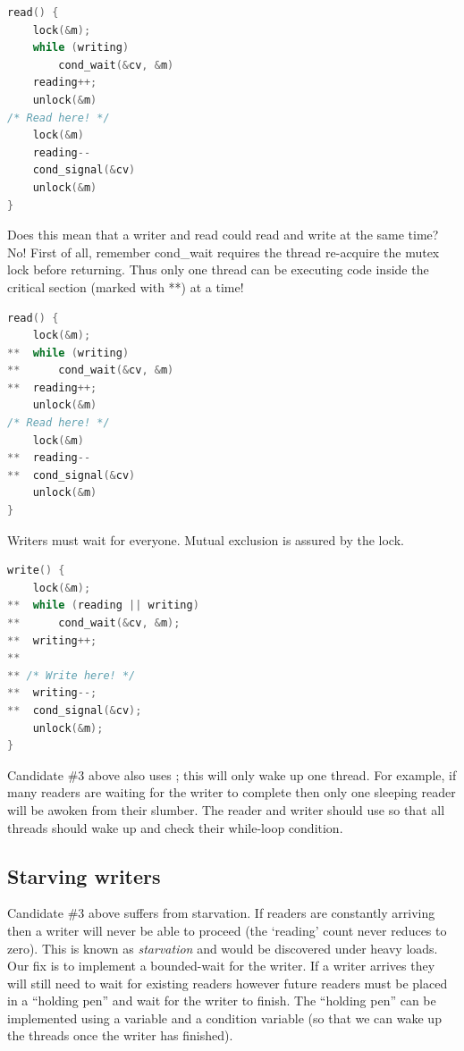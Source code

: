 \begin{lstlisting}[language=C]
read() {
    lock(&m);
    while (writing)
        cond_wait(&cv, &m)
    reading++;
    unlock(&m)
/* Read here! */
    lock(&m)
    reading--
    cond_signal(&cv)
    unlock(&m)
}
\end{lstlisting}

Does this mean that a writer and read could read and write at the same time? No! First of all, remember cond\_wait requires the thread re-acquire the mutex lock before returning. Thus only one thread can be executing code inside the critical section (marked with **) at a time!

\begin{lstlisting}[language=C]
read() {
    lock(&m);
**  while (writing)
**      cond_wait(&cv, &m)
**  reading++;
    unlock(&m)
/* Read here! */
    lock(&m)
**  reading--
**  cond_signal(&cv)
    unlock(&m)
}
\end{lstlisting}

Writers must wait for everyone. Mutual exclusion is assured by the lock.

\begin{lstlisting}[language=C]
write() {
    lock(&m);
**  while (reading || writing)
**      cond_wait(&cv, &m);
**  writing++;
**
** /* Write here! */
**  writing--;
**  cond_signal(&cv);
    unlock(&m);
}
\end{lstlisting}

Candidate \#3 above also uses  ; this will only wake up one thread. For example, if many readers are waiting for the writer to complete then only one sleeping reader will be awoken from their slumber. The reader and writer should use  so that all threads should wake up and check their while-loop condition.

\subsection{Starving writers}\label{starving-writers}

Candidate \#3 above suffers from starvation. If readers are constantly arriving then a writer will never be able to proceed (the `reading' count never reduces to zero). This is known as \emph{starvation} and would be discovered under heavy loads. Our fix is to implement a bounded-wait for the writer. If a writer arrives they will still need to wait for existing readers however future readers must be placed in a ``holding pen'' and wait for the writer to finish. The ``holding pen'' can be implemented using a variable and a condition variable (so that we can wake up the threads once the writer has finished).

